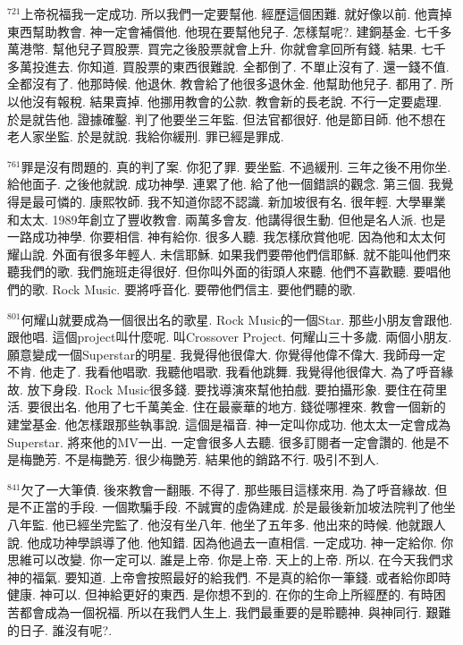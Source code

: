 \documentclass{book}
\begin{document}
$^{721}$上帝祝福我一定成功.
所以我們一定要幫他.
經歷這個困難.
就好像以前.
他賣掉東西幫助教會.
神一定會補償他.
他現在要幫他兒子.
怎樣幫呢?.
建銅基金.
七千多萬港幣.
幫他兒子買股票.
買完之後股票就會上升.
你就會拿回所有錢.
結果.
七千多萬投進去.
你知道.
買股票的東西很難說.
全都倒了.
不單止沒有了.
還一錢不值.
全都沒有了.
他那時候.
他退休.
教會給了他很多退休金.
他幫助他兒子.
都用了.
所以他沒有報稅.
結果賣掉.
他挪用教會的公款.
教會新的長老說.
不行一定要處理.
於是就告他.
證據確鑿.
判了他要坐三年監.
但法官都很好.
他是節目師.
他不想在老人家坐監.
於是就說.
我給你緩刑.
罪已經是罪成.

$^{761}$罪是沒有問題的.
真的判了案.
你犯了罪.
要坐監.
不過緩刑.
三年之後不用你坐.
給他面子.
之後他就說.
成功神學.
連累了他.
給了他一個錯誤的觀念.
第三個.
我覺得是最可憐的.
康熙牧師.
我不知道你認不認識.
新加坡很有名.
很年輕.
大學畢業和太太.
1989年創立了豐收教會.
兩萬多會友.
他講得很生動.
但他是名人派.
也是一路成功神學.
你要相信.
神有給你.
很多人聽.
我怎樣欣賞他呢.
因為他和太太何耀山說.
外面有很多年輕人.
未信耶穌.
如果我們要帶他們信耶穌.
就不能叫他們來聽我們的歌.
我們施班走得很好.
但你叫外面的街頭人來聽.
他們不喜歡聽.
要唱他們的歌.
Rock Music.
要將呼音化.
要帶他們信主.
要他們聽的歌.

$^{801}$何耀山就要成為一個很出名的歌星.
Rock Music的一個Star.
那些小朋友會跟他.
跟他唱.
這個project叫什麼呢.
叫Crossover Project.
何耀山三十多歲.
兩個小朋友.
願意變成一個Superstar的明星.
我覺得他很偉大.
你覺得他偉不偉大.
我師母一定不肯.
他走了.
我看他唱歌.
我聽他唱歌.
我看他跳舞.
我覺得他很偉大.
為了呼音緣故.
放下身段.
Rock Music很多錢.
要找導演來幫他拍戲.
要拍攝形象.
要住在荷里活.
要很出名.
他用了七千萬美金.
住在最豪華的地方.
錢從哪裡來.
教會一個新的建堂基金.
他怎樣跟那些執事說.
這個是福音.
神一定叫你成功.
他太太一定會成為Superstar.
將來他的MV一出.
一定會很多人去聽.
很多訂閱者一定會讚的.
他是不是梅艷芳.
不是梅艷芳.
很少梅艷芳.
結果他的銷路不行.
吸引不到人.

$^{841}$欠了一大筆債.
後來教會一翻賬.
不得了.
那些賬目這樣來用.
為了呼音緣故.
但是不正當的手段.
一個欺騙手段.
不誠實的虛偽建成.
於是最後新加坡法院判了他坐八年監.
他已經坐完監了.
他沒有坐八年.
他坐了五年多.
他出來的時候.
他就跟人說.
他成功神學誤導了他.
他知錯.
因為他過去一直相信.
一定成功.
神一定給你.
你思維可以改變.
你一定可以.
誰是上帝.
你是上帝.
天上的上帝.
所以.
在今天我們求神的福氣.
要知道.
上帝會按照最好的給我們.
不是真的給你一筆錢.
或者給你即時健康.
神可以.
但神給更好的東西.
是你想不到的.
在你的生命上所經歷的.
有時困苦都會成為一個祝福.
所以在我們人生上.
我們最重要的是聆聽神.
與神同行.
艱難的日子.
誰沒有呢?.
\end{document}
